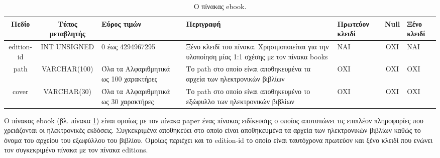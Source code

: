 \documentclass{assignment}
\begin{document}
\begin{landscape}
\begin{table}[htbp]
\begin{center}
  \begin{tabular}{|c|c|m{}|m{}|m{2.0cm}|c|m{1.5cm}|}
    \hline
    {\bf Πεδίο} & {\bf Τύπος μεταβλητής} & {\bf Εύρος τιμών} & {\bf Περιγραφή} & {\bf Πρωτεύον κλειδί} & {\bf Null} & {\bf Ξένο κλειδί} \\ \hline
    edition-id & INT UNSIGNED & 0 έως 4294967295 & Ξένο κλειδί του πίνακα. Χρησιμοποιείται για την υλοποίηση μίας 1:1 σχέσης με τον πίνακα books & ΝΑΙ & ΟΧΙ & NAI \\ \hline
    path & VARCHAR(100) &  Όλα τα Αλφαριθμητικά ως 100 χαρακτήρες & Το path στο οποίο είναι αποθηκευμένα τα αρχεία των ηλεκτρονικών βιβλίων & OXI & ΟΧΙ & ΟΧΙ \\ \hline
    cover & VARCHAR(30) &  Όλα τα Αλφαριθμητικά ως 30 χαρακτήρες & Το path στο οποίο είναι αποθηκευμένο το εξώφυλλο των ηλεκτρονικών βιβλίων & OXI & ΟΧΙ & ΟΧΙ \\ \hline
  \end{tabular}
\caption{Ο πίνακας ebook.}
\label{table:db_table:ebook}
\end{center}
\end{table}

Ο πίνακας ebook (βλ. πίνακα \ref{table:db_table:ebook}) είναι ομοίως με τον πίνακα paper ένας πίνακας ειδίκευσης ο οποίος αποτυπώνει τις επιπλέον πληροφορίες που χρειάζονται οι ηλεκτρονικές εκδόσεις. Συγκεκριμένα αποθηκεύει στο οποίο είναι αποθηκευμένα τα αρχεία των ηλεκτρονικών βιβλίων καθώς το όνομα του αρχείου του εξωφύλλου του βιβλίου. Ομοίως περιέχει και το edition-id το οποίο είναι ταυτόχρονα πρωτεύον και ξένο κλειδί που ενώνει τον συγκεκριμένο πίνακα με τον πίνακα editions. 
\end{landscape}
\end{document}
